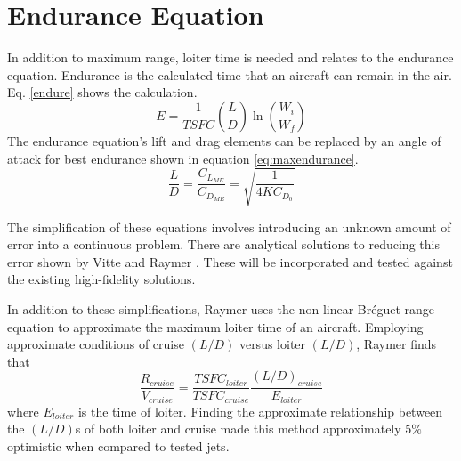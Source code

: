 \section{Endurance Equation}
In addition to maximum range, loiter time is needed and relates to the endurance equation. Endurance is the calculated time that an aircraft can remain in the air. Eq. \ref{endure} shows the calculation.
\begin{equation}
\label{endure}
E = \dfrac{1}{TSFC}\left(\dfrac{L}{D}\right) \ln\left(\dfrac{W_i}{W_f}\right)
\end{equation}
The endurance equation's lift and drag elements can be replaced by an angle of attack for best endurance \cite{OptimizeBreguet} shown in equation \ref{eq:maxendurance}.
\begin{equation}
\label{eq:maxendurance}
\dfrac{L}{D} = \dfrac{C_{L_{ME}}}{C_{D_{ME}}} = \sqrt{\dfrac{1}{4KC_{D_0}}}
\end{equation}
\par 
The simplification of these equations involves introducing an unknown amount of error into a continuous problem. There are analytical solutions to reducing this error shown by Vitte \cite{OptimizeBreguet} and Raymer \cite{LoiterTimeFromRange}. These will be incorporated and tested against the existing high-fidelity solutions.\par
In addition to these simplifications, Raymer \cite{LoiterTimeFromRange} uses the non-linear Br\'eguet range equation to approximate the maximum loiter time of an aircraft. Employing approximate conditions of cruise $(L/D)$ versus loiter $(L/D)$, Raymer \cite{LoiterTimeFromRange} finds that 
\begin{equation}
    \dfrac{R_{cruise}}{V_{cruise}} = \dfrac{TSFC_{loiter}}{TSFC_{cruise}}\dfrac{(L/D)_{cruise}}{E_{loiter}}
\end{equation}
where $E_{loiter}$ is the time of loiter. Finding the approximate relationship between the $(L/D)$s of both loiter and cruise made this method approximately $5\%$ optimistic when compared to tested jets. 
